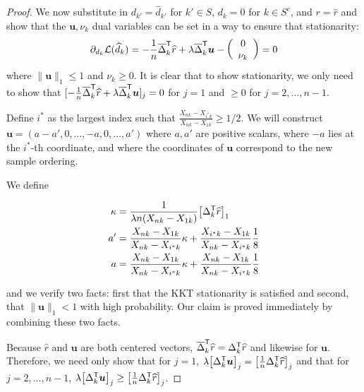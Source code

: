 \begin{proof}
We now substitute in $d_{k'} = \hat{d}_{k'}$ for $k' \in S$, $d_k = 0$ for $k \in S^c$, and $r = \hat{r}$ and show that the $\mathbf{u}, \nu_k$ dual variables can be set in a way to ensure that stationarity:
\begin{align*}
\partial_{d_k} \mathcal{L}(\widehat{d}_k) = -\frac{1}{n} \overline{\Delta}_k^{\mathsf{T}}\widehat{r} + \lambda \overline{\Delta}_k^{\mathsf{T}} \mbox{\boldmath $u$}
           - \left( \begin{array}{c} 0 \\ \nu_k \end{array} \right) = 0 
\end{align*}
where $\| \mathbf{u} \|_1 \leq 1$ and $\nu_k \geq 0$. It is clear that to show stationarity, we only need to show that $[-\frac{1}{n} \overline{\Delta}_k^{\mathsf{T}} \widehat{r} + \lambda \overline{\Delta}_k^{\mathsf{T}} \mbox{\boldmath $u$}]_j = 0$ for $j=1$ and $\geq 0$ for $j=2,...,n-1$.


Define $i^*$ as the largest index such that $\frac{X_{nk} - X_{i^*k}}{X_{nk} - X_{1k}} \geq 1/2$. 
We will construct $\mathbf{u} = (a - a', 0, ..., -a, 0,..., a')$ where
$a,a'$ are positive scalars, where $-a$ lies at the $i^*$-th coordinate, and where the coordinates of $\mathbf{u}$ correspond
to the new sample ordering. 

We define

\begin{align*}
\kappa &= \frac{1}{\lambda n (X_{nk} - X_{1k})} \big[ \Delta_k^{\mathsf{T}} \widehat{r} \big]_1 \\
a' &= \frac{X_{nk} - X_{1k}}{X_{nk} -  X_{i^*k}} \kappa + 
     \frac{X_{i^*k}-X_{1k}}{X_{nk} - X_{i^*k}} \frac{1}{8} \\
a &= \frac{X_{nk} - X_{1k}}{X_{nk} -  X_{i^*k}} \kappa + 
     \frac{X_{nk}-X_{1k}}{X_{nk} - X_{i^*k}} \frac{1}{8} \\
\end{align*}

and we verify two facts: first that the KKT stationarity is satisfied and second, that $\| \mathbf{u} \|_1 < 1$ with high probability. Our claim is proved immediately by combining these two facts.

Because $\hat{r}$ and $\mathbf{u}$ are both centered vectors, $\overline{\Delta}_k^{\mathsf{T}} \widehat{r} = \Delta_k^{\mathsf{T}} \widehat{r}$ and likewise for $\mathbf{u}$. Therefore, we need only show that for $j=1$, $\lambda \big[ \Delta_k^{\mathsf{T}} \mbox{\boldmath $u$} \big]_j = \big[ \frac{1}{n} \Delta_k^{\mathsf{T}} \widehat{r} \big]_j$ and that for $j = 2,..., n-1$, $\lambda \big[ \Delta_k^{\mathsf{T}} \mbox{\boldmath $u$} \big]_j \geq \big[ \frac{1}{n} \Delta_k^{\mathsf{T}} \widehat{r} \big]_j$.


\end{proof}
